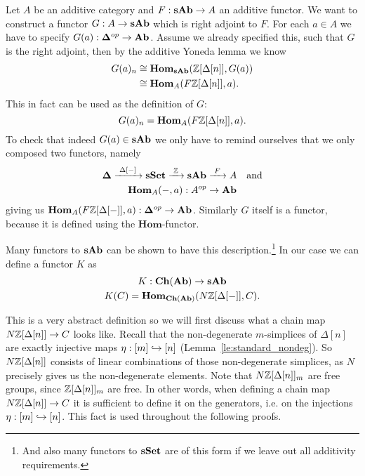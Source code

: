 Let $A$ be an additive category and $F: \mathbf{sAb} \to A$ an additive functor. We want to construct a functor $G: A \to \mathbf{sAb}$ which is right adjoint to $F$. For each $a \in A$ we have to specify $G(a): \mathbf{\Delta}^{op} \to \mathbf{Ab}$. Assume we already specified this, such that $G$ is the right adjoint, then by the additive Yoneda lemma we know
\begin{align*}
	G(a)_n &\cong \mathbf{Hom}_{\mathbf{sAb}}(\mathbb{Z}[\Delta[n]], G(a)) \\
		&\cong \mathbf{Hom}_{A}(F\mathbb{Z}[\Delta[n]], a).
\end{align*}
This in fact can be used as the definition of $G$:
$$ G(a)_n = \mathbf{Hom}_{A}(F\mathbb{Z}[\Delta[n]], a). $$
To check that indeed $G(a) \in \mathbf{sAb}$ we only have to remind ourselves that we only composed two functors, namely
\begin{gather*}
	\mathbf{\Delta} \xrightarrow{\,\,{\Delta[-]}\,\,} \mathbf{sSet} \xrightarrow{\,\,{\mathbb{Z}}\,\,} \mathbf{sAb} \xrightarrow{\,\,{F}\,\,} A \quad\text{and} \\
	\mathbf{Hom}_{A}(-, a): A^{op} \to \mathbf{Ab}
\end{gather*}
giving us $\mathbf{Hom}_{A}(F\mathbb{Z}[\Delta[-]], a): \mathbf{\Delta}^{op} \to \mathbf{Ab}$. Similarly $G$ itself is a functor, because it is defined using the $\mathbf{Hom}$-functor.

Many functors to $\mathbf{sAb}$ can be shown to have this description.\footnote{And also many functors to $\mathbf{sSet}$ are of this form if we leave out all additivity requirements.} In our case we can define a functor $K$ as
\begin{gather*}
	K: \mathbf{Ch}(\mathbf{Ab}) \to \mathbf{sAb} \\
	K(C) = \mathbf{Hom}_{\mathbf{Ch}(\mathbf{Ab})}(N\mathbb{Z}[\Delta[-]], C).
\end{gather*}

This is a very abstract definition so we will first discuss what a chain map $N\mathbb{Z}[\Delta[n]] \to C$ looks like. Recall that the non-degenerate $m$-simplices of $\Delta[n]$ are exactly injective maps $\eta: [m] \hookrightarrow [n]$ (Lemma~\ref{le:standard_nondeg}). So $N\mathbb{Z}[\Delta[n]]$ consists of linear combinations of those non-degenerate simplices, as $N$ precisely gives us the non-degenerate elements. Note that $N\mathbb{Z}[\Delta[n]]_m$ are free groups, since $\mathbb{Z}[\Delta[n]]_m$ are free. In other words, when defining a chain map $N\mathbb{Z}[\Delta[n]] \to C$ it is sufficient to define it on the generators, i.e. on the injections $\eta: [m] \hookrightarrow [n]$. This fact is used throughout the following proofs.

